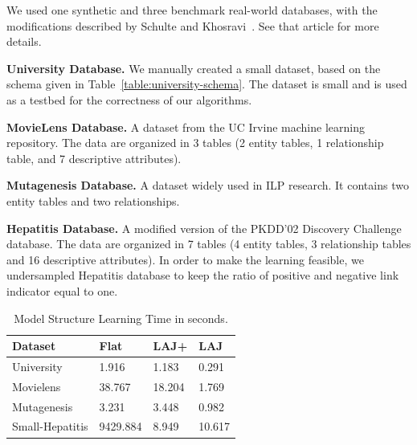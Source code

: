 \documentclass{article}
\begin{document}
We used one synthetic and 
three benchmark real-world databases, with the modifications described by Schulte and Khosravi~\cite{Schulte2012}. See that article for more
details.

\noindent\textbf{University Database.} We manually created a small dataset, based on the schema given in Table~\ref{table:university-schema}. 
The dataset is small and is used as a testbed for the correctness of our algorithms.

\noindent\textbf{MovieLens Database.} A dataset from the UC Irvine machine learning repository. The data are organized in 3 tables (2 entity tables, 1 relationship table, and 7 descriptive attributes). 

\noindent\textbf{Mutagenesis Database.} A dataset widely used in ILP research. %
It contains two entity tables and two relationships.

\noindent\textbf{Hepatitis Database.} A modified version of the PKDD'02 Discovery Challenge database. The data are organized in 7 tables (4 entity tables, 3 relationship tables and 16 descriptive attributes). In order to make the learning feasible, we undersampled Hepatitis database to keep the ratio of positive and negative link indicator equal to one. %




\begin{table} \centering
\begin{tabular}[c]
{|l|l|l|l|}\hline
 \textbf{Dataset} & \textbf{Flat} & \textbf{LAJ+} & \textbf{LAJ}\\\hline
University&1.916&1.183&0.291 \\\hline
Movielens &38.767& 18.204& 1.769\\\hline
Mutagenesis &3.231& 3.448& 0.982\\\hline
Small-Hepatitis &9429.884&8.949&10.617 \\\hline
\end{tabular}
\caption{Model Structure Learning Time  in seconds.
 \label{table:runtimes}}
\end{table}
\end{document}
